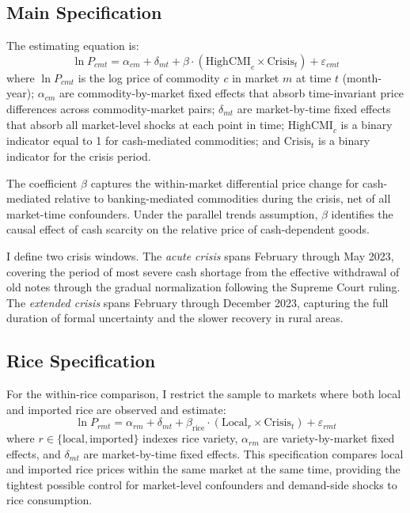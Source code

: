 \documentclass[12pt]{article}
\begin{document}
\subsection{Main Specification}

The estimating equation is:
\begin{equation}
\ln P_{cmt} = \alpha_{cm} + \delta_{mt} + \beta \cdot (\text{HighCMI}_c \times \text{Crisis}_t) + \varepsilon_{cmt}
\label{eq:main}
\end{equation}
where $\ln P_{cmt}$ is the log price of commodity $c$ in market $m$ at time $t$ (month-year); $\alpha_{cm}$ are commodity-by-market fixed effects that absorb time-invariant price differences across commodity-market pairs; $\delta_{mt}$ are market-by-time fixed effects that absorb all market-level shocks at each point in time; $\text{HighCMI}_c$ is a binary indicator equal to 1 for cash-mediated commodities; and $\text{Crisis}_t$ is a binary indicator for the crisis period.

The coefficient $\beta$ captures the within-market differential price change for cash-mediated relative to banking-mediated commodities during the crisis, net of all market-time confounders. Under the parallel trends assumption, $\beta$ identifies the causal effect of cash scarcity on the relative price of cash-dependent goods.

I define two crisis windows. The \emph{acute crisis} spans February through May 2023, covering the period of most severe cash shortage from the effective withdrawal of old notes through the gradual normalization following the Supreme Court ruling. The \emph{extended crisis} spans February through December 2023, capturing the full duration of formal uncertainty and the slower recovery in rural areas.

\subsection{Rice Specification}

For the within-rice comparison, I restrict the sample to markets where both local and imported rice are observed and estimate:
\begin{equation}
\ln P_{rmt} = \alpha_{rm} + \delta_{mt} + \beta_{\text{rice}} \cdot (\text{Local}_r \times \text{Crisis}_t) + \varepsilon_{rmt}
\label{eq:rice}
\end{equation}
where $r \in \{\text{local}, \text{imported}\}$ indexes rice variety, $\alpha_{rm}$ are variety-by-market fixed effects, and $\delta_{mt}$ are market-by-time fixed effects. This specification compares local and imported rice prices within the same market at the same time, providing the tightest possible control for market-level confounders and demand-side shocks to rice consumption.
\end{document}
